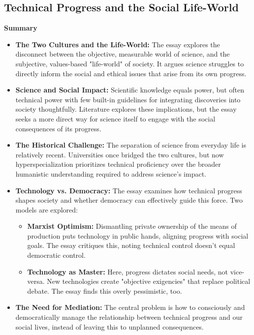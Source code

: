 \documentclass[11pt,fleqn]{book} %
\begin{document}
\subsection{Technical Progress and the Social Life-World}
\textbf{Summary}

\begin{itemize}
\item \textbf{The Two Cultures and the Life-World:} The essay explores the disconnect between the objective, measurable world of science, and the subjective, values-based "life-world" of society. It argues science struggles to directly inform the social and ethical issues that arise from its own progress. 

\item \textbf{Science and Social Impact:} Scientific knowledge equals power, but often technical power with few built-in guidelines for integrating discoveries into society thoughtfully. Literature explores these implications, but the essay seeks a more direct way for science itself to engage with the social consequences of its progress.

\item \textbf{The Historical Challenge:} The separation of science from everyday life is relatively recent. Universities once bridged the two cultures, but now hyperspecialization prioritizes technical proficiency over the broader humanistic understanding required to address science's impact.

\item \textbf{Technology vs. Democracy:} The essay examines how technical progress shapes society and whether democracy can effectively guide this force. Two models are explored:
    \begin{itemize}
        \item \textbf{Marxist Optimism:} Dismantling private ownership of the means of production puts technology in public hands, aligning progress with social goals. The essay critiques this, noting technical control doesn't equal democratic control.

        \item \textbf{Technology as Master:} Here, progress dictates social needs, not vice-versa.  New technologies create "objective exigencies" that replace political debate. The essay finds this overly pessimistic, too.
    \end{itemize}

\item \textbf{The Need for Mediation:}  The central problem is how to consciously and democratically manage the relationship between technical progress and our social lives, instead of leaving this to unplanned consequences.


\end{itemize}
\end{document}
